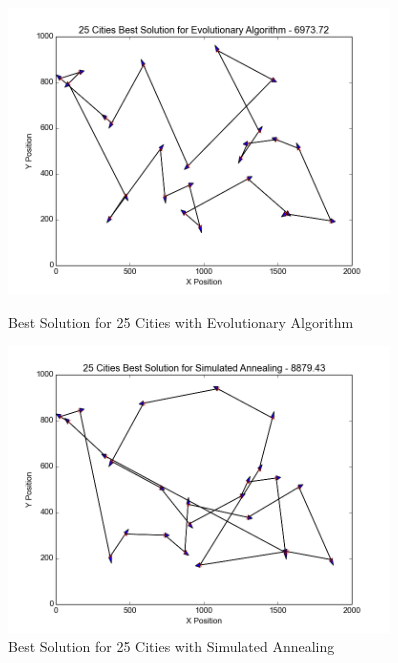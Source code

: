 \begin{figure}[H]
	\centering
    \begin{minipage}{0.45\textwidth}
        \centering
        \includegraphics[width=0.9\textwidth]{25City_EA.png} %
        \caption{Best Solution for 25 Cities with Evolutionary Algorithm}
        \label{fig:25city_EA}
    \end{minipage}\hfill
    \begin{minipage}{0.45\textwidth}
        \centering
        \includegraphics[width=0.9\textwidth]{25City_SA.png} %
        \caption{Best Solution for 25 Cities with Simulated Annealing}
        \label{fig:25city_SA}
    \end{minipage}\hfill
    \begin{minipage}{0.45\textwidth}
        \centering

\end{minipage}
\end{figure}
